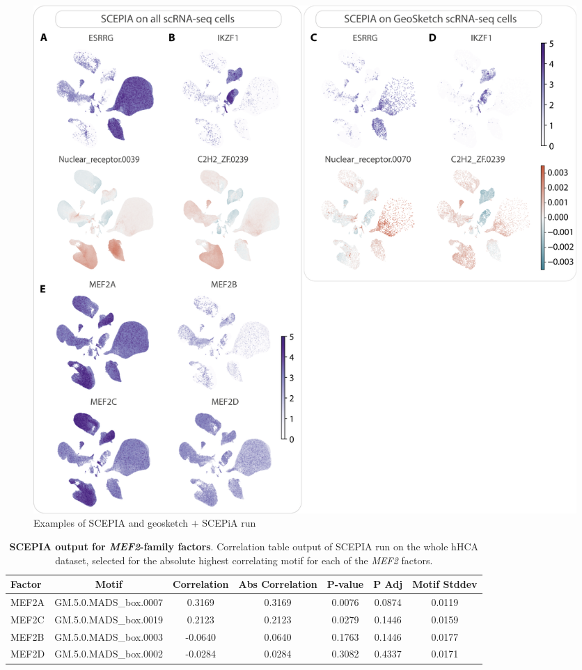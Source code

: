 \begin{figure}
    \centering
    \includegraphics[height=0.666\linewidth]{ch.scepia/imgs/SCEPIA_SCEPIAGEO_BiologicalExamples_Myriad_v4_SuppFigFeatures2.png}
    \caption{Examples of SCEPIA and geosketch $+$ SCEPiA run}
    \label{fig:scepia_features2}
\end{figure}
\begin{table}[htbp]
    \centering
    \caption{\textbf{SCEPIA output for \textit{MEF2}-family factors}. Correlation table output of SCEPIA run on the whole hHCA dataset, selected for the absolute highest correlating motif for each of the \textit{MEF2} factors.}
    \label{tab:corrtable_SCEPIA}
    \begin{tabular}{lcccccc}
        \toprule
        \textbf{Factor} & \textbf{Motif} & \textbf{Correlation} & \textbf{Abs Correlation} & \textbf{P-value} & \textbf{P Adj} & \textbf{Motif Stddev} \\
        \midrule
        MEF2A & GM.5.0.MADS\_box.0007 & 0.3169 & 0.3169 & 0.0076 & 0.0874 & 0.0119 \\
        MEF2C & GM.5.0.MADS\_box.0019 & 0.2123 & 0.2123 & 0.0279 & 0.1446 & 0.0159 \\
        MEF2B & GM.5.0.MADS\_box.0003 & -0.0640 & 0.0640 & 0.1763 & 0.1446 & 0.0177 \\
        MEF2D & GM.5.0.MADS\_box.0002 & -0.0284 & 0.0284 & 0.3082 & 0.4337 & 0.0171 \\
        \bottomrule
    \end{tabular}
\end{table}

